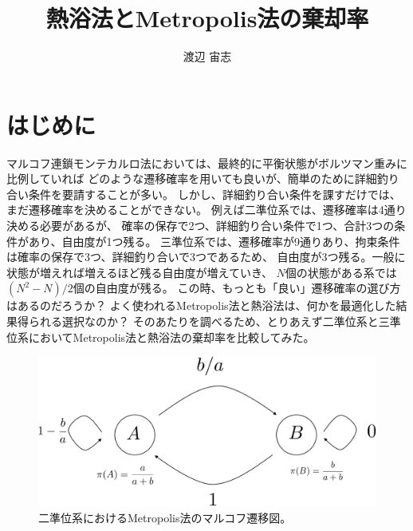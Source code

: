 \documentclass{jarticle}
\title{熱浴法とMetropolis法の棄却率}
\author{渡辺 宙志}
\affiliation{慶應義塾大学理工学部物理情報工学科}
\begin{document}
\maketitle

\section{はじめに}

マルコフ連鎖モンテカルロ法においては、最終的に平衡状態がボルツマン重みに比例していれば
どのような遷移確率を用いても良いが、簡単のために詳細釣り合い条件を要請することが多い。
しかし、詳細釣り合い条件を課すだけでは、まだ遷移確率を決めることができない。
例えば二準位系では、遷移確率は4通り決める必要があるが、
確率の保存で2つ、詳細釣り合い条件で1つ、合計3つの条件があり、自由度が1つ残る。
三準位系では、遷移確率が9通りあり、拘束条件は確率の保存で3つ、詳細釣り合いで3つであるため、
自由度が3つ残る。一般に状態が増えれば増えるほど残る自由度が増えていき、
$N$個の状態がある系では$(N^2-N)/2$個の自由度が残る。
この時、もっとも「良い」遷移確率の選び方はあるのだろうか？
よく使われるMetropolis法と熱浴法は、何かを最適化した結果得られる選択なのか？
そのあたりを調べるため、とりあえず二準位系と三準位系においてMetropolis法と熱浴法の棄却率を比較してみた。

\begin{figure}[bt]
\begin{center}
\includegraphics[bb = 0 0 647 287,width=0.5\linewidth]{level2.pdf}
\end{center}
\caption{二準位系におけるMetropolis法のマルコフ遷移図。}
\label{fig_level2}
\end{figure}
\end{document}
